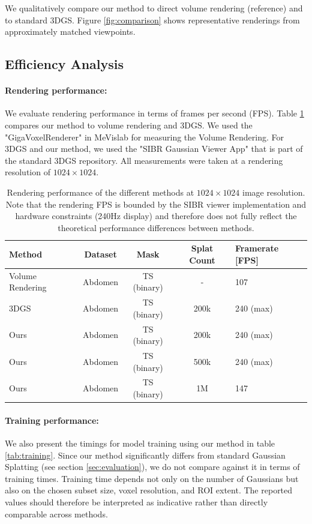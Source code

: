 \documentclass[runningheads]{llncs}
\begin{document}
We qualitatively compare our method to direct volume rendering (reference) and to standard 3DGS. Figure \ref{fig:comparison} shows representative renderings from approximately matched viewpoints.

\subsection{Efficiency Analysis}

\paragraph{Rendering performance:}
We evaluate rendering performance in terms of frames per second (FPS). Table \ref{tab:fps} compares our method to volume rendering and 3DGS. We used the "GigaVoxelRenderer" in MeVislab for measuring the Volume Rendering. For 3DGS and our method, we used the "SIBR Gaussian Viewer App" that is part of the standard 3DGS repository. All measurements were taken at a rendering resolution of $1024 \times 1024$.

\begin{table}
\centering
\caption{Rendering performance of the different methods at $1024 \times 1024$ image resolution. Note that the rendering FPS is bounded by the SIBR viewer implementation and hardware constraints (240Hz display) and therefore does not fully reflect the theoretical performance differences between methods.}\label{tab:fps}
\setlength{\tabcolsep}{4pt}
\renewcommand{\arraystretch}{1.1}
\begin{tabular}{|l|c|c|c|l|}
\hline
Method & Dataset & Mask & Splat Count & Framerate [FPS]\\
\hline
Volume Rendering    & Abdomen  & TS (binary) & - & 107\\
3DGS                & Abdomen  & TS (binary) & 200k & 240 (max) \\
Ours                & Abdomen  & TS (binary) & 200k & 240 (max) \\
Ours                & Abdomen  & TS (binary) & 500k & 240 (max) \\
Ours                & Abdomen  & TS (binary) & 1M & 147 \\
\hline
\end{tabular}
\end{table}

\paragraph{Training performance:}
We also present the timings for model training using our method in table \ref{tab:training}. Since our method significantly differs from standard Gaussian Splatting (see section \ref{sec:evaluation}), we do not compare against it in terms of training times.
Training time depends not only on the number of Gaussians but also on the chosen subset size, voxel resolution, and ROI extent. The reported values should therefore be interpreted as indicative rather than directly comparable across methods.
\end{document}
